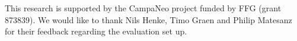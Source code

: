\documentclass[../paper.tex]{subfiles}
\begin{document}
This research is supported by the CampaNeo project funded by FFG (grant 873839). We would like to thank Nils Henke, Timo Graen and Philip Matesanz for their feedback regarding the evaluation set up.
\end{document}
